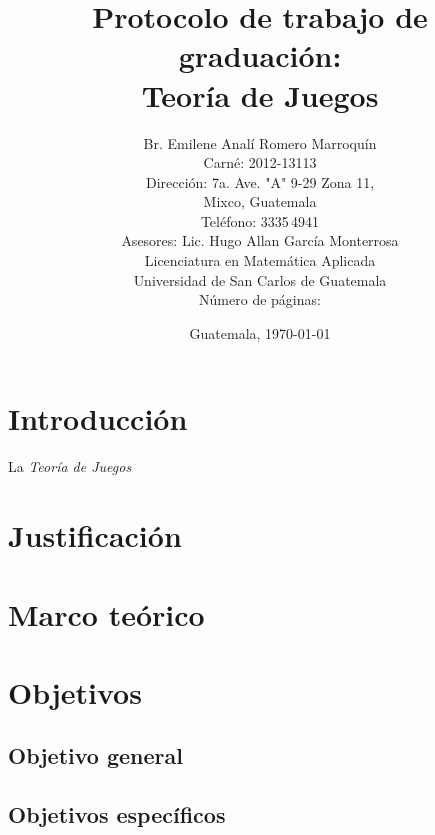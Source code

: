 \documentclass[12pt,letterpaper,titlepage]{article}
\title{Protocolo de trabajo de graduación:\\
Teoría de Juegos}
\author{Br. Emilene Analí Romero Marroquín\\Carné: 2012-13113\\Dirección: 7a. Ave. "A" 9-29 Zona 11,\\Mixco, Guatemala\\Teléfono: 3335\,4941\\Asesores: Lic. Hugo Allan García Monterrosa\\Licenciatura en Matemática Aplicada\\Universidad de San Carlos de Guatemala\\Número de páginas: \pageref{fin}}
\date{Guatemala, \today}
\begin{document}
\maketitle
\setcounter{page}{2}
\tableofcontents

\newpage

\section{Introducción}
La \textit{Teoría de Juegos} 
\newpage

\section{Justificación}





\newpage

\section{Marco teórico}


\newpage

\section{Objetivos}


\subsection{Objetivo general}



\subsection{Objetivos específicos}

\newpage
\end{document}
